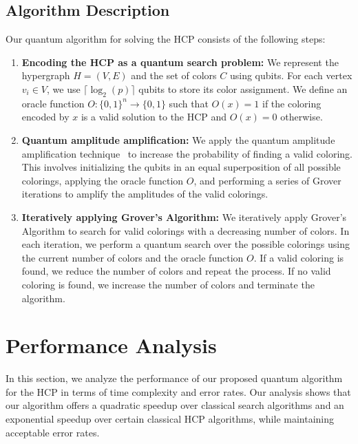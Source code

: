 \subsection{Algorithm Description}\label{subsec:description}
Our quantum algorithm for solving the HCP consists of the following steps:

\begin{enumerate}
    \item \textbf{Encoding the HCP as a quantum search problem:} We represent the hypergraph $H = (V, E)$ and the set of colors $C$ using qubits. For each vertex $v_i \in V$, we use $\lceil \log_2 (p) \rceil$ qubits to store its color assignment. We define an oracle function $O: \{0, 1\}^n \rightarrow \{0, 1\}$ such that $O(x) = 1$ if the coloring encoded by $x$ is a valid solution to the HCP and $O(x) = 0$ otherwise.
    
    \item \textbf{Quantum amplitude amplification:} We apply the quantum amplitude amplification technique~\cite{brassard1998quantum} to increase the probability of finding a valid coloring. This involves initializing the qubits in an equal superposition of all possible colorings, applying the oracle function $O$, and performing a series of Grover iterations to amplify the amplitudes of the valid colorings.
    
    \item \textbf{Iteratively applying Grover's Algorithm:} We iteratively apply Grover's Algorithm to search for valid colorings with a decreasing number of colors. In each iteration, we perform a quantum search over the possible colorings using the current number of colors and the oracle function $O$. If a valid coloring is found, we reduce the number of colors and repeat the process. If no valid coloring is found, we increase the number of colors and terminate the algorithm.
\end{enumerate}

\section{Performance Analysis}\label{sec:performance}
In this section, we analyze the performance of our proposed quantum algorithm for the HCP in terms of time complexity and error rates. Our analysis shows that our algorithm offers a quadratic speedup over classical search algorithms and an exponential speedup over certain classical HCP algorithms, while maintaining acceptable error rates.

